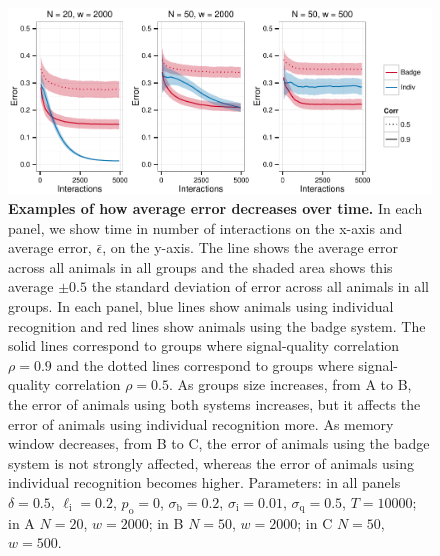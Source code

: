 \begin{figure}[ht]

\label{learning_curves}
\includegraphics[width=.95\textwidth]{figures/learning_curves.pdf}
\caption{\label{curves} \sffamily\small\textbf{Examples of how average error decreases over time.}
In each panel, we show time in number of interactions on the x-axis and average error, $\bar{\epsilon}$, on the y-axis. The line shows the average error across all animals in all groups and the shaded area shows this average $\pm 0.5$ the standard deviation of error across all animals in all groups. In each panel, blue lines show animals using individual recognition and red lines show animals using the badge system. The solid lines correspond to groups where signal-quality correlation $\rho=0.9$ and the dotted lines correspond to groups where signal-quality correlation $\rho=0.5$. As groups size increases, from A to B, the error of animals using both systems increases, but it affects the error of animals using individual recognition more. As memory window decreases, from B to C, the error of animals using the badge system is not strongly affected, whereas the error of animals using individual recognition becomes higher. Parameters: in all panels $\delta = 0.5$, $\ell_\text{i}=0.2$, $p_\text{o}=0$, $\sigma_\text{b}=0.2$, $\sigma_\text{i}=0.01$, $\sigma_\text{q}=0.5$, $T=10000$; in A $N=20$, $w=2000$; in B $N=50$, $w=2000$; in C $N=50$, $w=500$. }
\end{figure}

